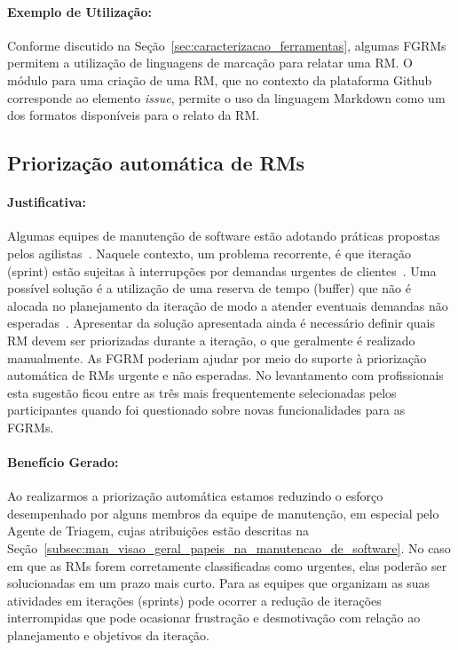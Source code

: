 \paragraph{Exemplo de Utilização:}
\label{par:exemplo_de_utilização_s06}

Conforme discutido na Seção~\ref{sec:caracterizacao_ferramentas}, algumas FGRMs
permitem a utilização de linguagens de marcação para relatar uma RM\@. O módulo
para uma criação de uma RM, que no contexto da plataforma Github corresponde ao
elemento \textit{issue}, permite o uso da linguagem Markdown como um dos
formatos disponíveis para o relato da RM\@.

\subsection{Priorização automática de RMs}
\label{sub:priorizacao_automatica_rms}


\paragraph{Justificativa:}
\label{par:justificativa_s07}

Algumas equipes de manutenção de software estão adotando práticas propostas
pelos agilistas~\cite{svensson2005introducing}. Naquele contexto, um problema
recorrente, é que iteração (sprint) estão sujeitas à interrupções por demandas
urgentes de clientes~\cite{bennett2000software}. Uma possível solução é a
utilização de uma reserva de tempo (buffer) que não é alocada no planejamento da
iteração de modo a atender eventuais demandas não
esperadas~\cite{schwaber2002agile}. Apresentar da solução apresentada ainda é
necessário definir quais RM devem ser priorizadas durante a iteração, o que
geralmente é realizado manualmente. As FGRM poderiam ajudar por meio do suporte
à priorização automática de RMs urgente e não esperadas. No levantamento com
profissionais esta sugestão ficou entre as três mais frequentemente selecionadas
pelos participantes quando foi questionado sobre novas funcionalidades para as
FGRMs.

\paragraph{Benefício Gerado:}
\label{par:papéis_afetados_s07}

Ao realizarmos a priorização automática estamos reduzindo o esforço desempenhado
por alguns membros da equipe de manutenção, em especial pelo Agente de Triagem,
cujas atribuições estão descritas na
Seção~\ref{subsec:man_visao_geral_papeis_na_manutencao_de_software}. No caso em
que as RMs forem corretamente classificadas como urgentes, elas poderão ser
solucionadas em um prazo mais curto. Para as equipes que organizam as suas
atividades em iterações (sprints) pode ocorrer a redução de iterações
interrompidas que pode ocasionar frustração e desmotivação com relação ao
planejamento e objetivos da iteração.

